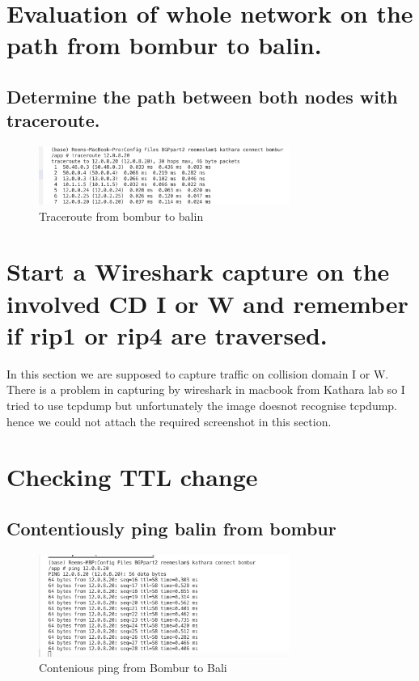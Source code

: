 \section{Evaluation of whole network on the path from bombur to balin.}

\subsection{Determine the path between both nodes with traceroute.}

\begin{figure}[H]
\centering
  \includegraphics[width=0.73\textwidth]{Images/traceR2BomToBalin.png}
  \caption{Traceroute from bombur to balin}
  \label{fig:2.21}
\end{figure}


\section{Start a Wireshark capture on the involved CD I or W and remember if rip1 or rip4 are traversed.}
In this section we are supposed to capture traffic on collision domain I or W.
\\ There is a problem in capturing by wireshark in macbook from Kathara lab so I tried to use tcpdump but unfortunately the image doesnot recognise tcpdump.
hence we could not attach the required screenshot in this section.

\section{Checking TTL change}
\subsection{Contentiously ping balin from bombur }
\begin{figure}[H]
\centering
  \includegraphics[width=0.73\textwidth]{Images/pingFromBomTobal.png}
  \caption{Contenious ping from Bombur to Bali}
  \label{fig:2.22}
\end{figure}
